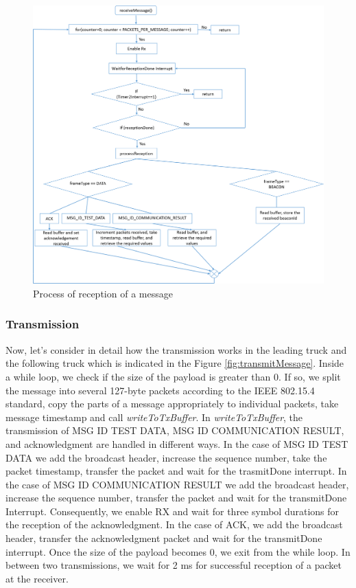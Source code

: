 \begin{figure}[h!]
	\includegraphics[width=1\textwidth]{figures/receiveMessage}
	\centering
	\caption{Process of reception of a message}
	\label{fig:receiveMessage}    
\end{figure}

\subsubsection{Transmission}
Now, let's consider in detail how the transmission works in the leading truck and the following truck which is indicated in the Figure \ref{fig:transmitMessage}. Inside a while loop, we check if the size of the payload is greater than 0. If so, we split the message into several 127-byte packets according to the IEEE 802.15.4 standard, copy the parts of a message appropriately to individual packets, take message timestamp and call \emph{writeToTxBuffer}. In \emph{writeToTxBuffer}, the transmission of MSG ID TEST DATA, MSG ID COMMUNICATION RESULT, and acknowledgment are handled in different ways. In the case of MSG ID TEST DATA we add the broadcast header, increase the sequence number, take the packet timestamp, transfer the packet and wait for the trasmitDone interrupt. In the case of MSG ID COMMUNICATION RESULT we add the broadcast header, increase the sequence number, transfer the packet and wait for the transmitDone Interrupt. Consequently, we enable RX and wait for three symbol durations for the reception of the acknowledgment. In the case of ACK, we add the broadcast header, transfer the acknowledgment packet and wait for the transmitDone interrupt. Once the size of the payload becomes 0, we exit from the while loop. In between two transmissions, we wait for 2 ms for successful reception of a packet at the receiver.


